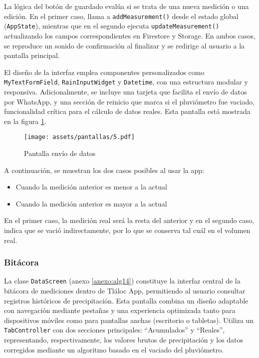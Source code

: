 La lógica del botón de guardado evalúa si se trata de una nueva medición o una edición. En el primer caso, llama a \texttt{addMeasurement()} desde el estado global (\texttt{AppState}), mientras que en el segundo ejecuta \texttt{updateMeasurement()} actualizando los campos correspondientes en Firestore y Storage. En ambos casos, se reproduce un sonido de confirmación al finalizar y se redirige al usuario a la pantalla principal.

El diseño de la interfaz emplea componentes personalizados como \texttt{MyTextFormField}, \texttt{RainInputWidget} y \texttt{Datetime}, con una estructura modular y responsiva. Adicionalmente, se incluye una tarjeta que facilita el envío de datos por WhatsApp, y una sección de reinicio que marca si el pluviómetro fue vaciado, funcionalidad crítica para el cálculo de datos reales. Esta pantalla está mostrada en la figura \ref{pantallas5}.

\begin{figure}[h!]
\centering
  \texttt{[image: assets/pantallas/5.pdf]}
  \caption{Pantalla envío de datos}
  \label{pantallas5}
\end{figure}

A continuación, se muestran los dos casos posibles al usar la app:
\begin{itemize}
  \item Cuando la medición anterior es menor a la actual
  \item Cuando la medición anterior es mayor a la actual
\end{itemize}
En el primer caso, la medición real será la resta del anterior y en el segundo caso, indica que se vació indirectamente, por lo que se conserva tal cuál en el volumen real.


\newpage
\subsubsection*{Bitácora}

La clase \texttt{DataScreen}  (anexo \ref{anexo:alg14}) constituye la interfaz central de la bitácora de mediciones dentro de Tláloc App, permitiendo al usuario consultar registros históricos de precipitación. Esta pantalla combina un diseño adaptable con navegación mediante pestañas y una experiencia optimizada tanto para dispositivos móviles como para pantallas anchas (escritorio o tabletas). Utiliza un \texttt{TabController} con dos secciones principales: ``Acumulados'' y ``Reales'', representando, respectivamente, los valores brutos de precipitación y los datos corregidos mediante un algoritmo basado en el vaciado del pluviómetro.

